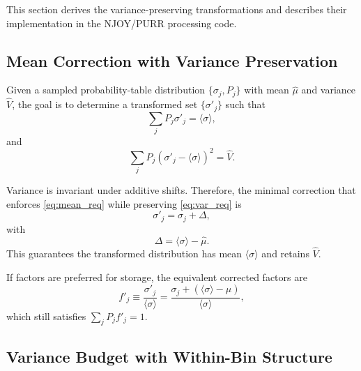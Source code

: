 \documentclass{style/nseJournal}
\newcommand{\sbin}{\langle \sigma \rangle}
\begin{document}
This section derives the variance-preserving transformations and describes their implementation in the NJOY/PURR processing code.

\subsection{Mean Correction with Variance Preservation}
\label{ssec:var-pres}

Given a sampled probability-table distribution $\{\sigma_j,P_j\}$ with mean $\hat{\mu}$ and variance $\hat{V}$, the goal is to determine a transformed set $\{\sigma'_j\}$ such that
\begin{equation}
\sum_j P_j \sigma'_j = \sbin,
\label{eq:mean_req}
\end{equation}
and
\begin{equation}
\sum_j P_j(\sigma'_j-\sbin)^2 = \hat{V}.
\label{eq:var_req}
\end{equation}

Variance is invariant under additive shifts. Therefore, the minimal correction that enforces \autoref{eq:mean_req} while preserving \autoref{eq:var_req} is
\begin{equation}
\sigma'_j = \sigma_j + \Delta,
\label{eq:affine_shift}
\end{equation}
with
\begin{equation}
\Delta = \sbin-\hat{\mu}.
\label{eq:Delta_def}
\end{equation}
This guarantees the transformed distribution has mean $\sbin$ and retains $\hat{V}$.

If factors are preferred for storage, the equivalent corrected factors are
\begin{equation}
f'_j \equiv \frac{\sigma'_j}{\sbin}
= \frac{\sigma_j + (\sbin-\hat{\mu})}{\sbin},
\label{eq:fprime_shift}
\end{equation}
which still satisfies $\sum_j P_j f'_j = 1$.

\subsection{Variance Budget with Within-Bin Structure}
\label{ssec:double-dipping}
\end{document}
